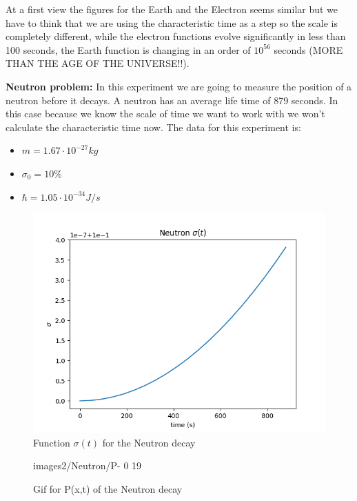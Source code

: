 At a first view the figures for the Earth and the Electron seems similar but we have to think that we are using the characteristic time as a step so the scale is completely different, while the electron functions evolve significantly in less than 100 seconds, the Earth function is changing in an order of $10^{56}$ seconds (MORE THAN THE AGE OF THE UNIVERSE!!).


\textbf{Neutron problem: } In this experiment we are going to measure the position of a neutron before it decays. A neutron has an average life time of 879 seconds. In this case because we know the scale of time we want to work with we won't calculate the characteristic time now. The data for this experiment is:


\begin{itemize}
    \item $m = 1.67 \cdot 10^{-27} kg$
    \item $ \sigma_0 = 10\% $
    \item $\hbar = 1.05 \cdot 10^{-34} J/s$
\end{itemize}

\begin{figure}[H]
    \centering
    \includegraphics{images2/Neutron/sigma.png}
    \caption{Function $\sigma(t)$ for the Neutron decay}
    \label{fig:sigma_neutron}
\end{figure}

\begin{figure}[H]
    \centering
    {images2/Neutron/P-}%
    {0}%
    {19}%
    \caption{Gif for P(x,t) of the Neutron decay}
    \label{P_neutron}
\end{figure}

